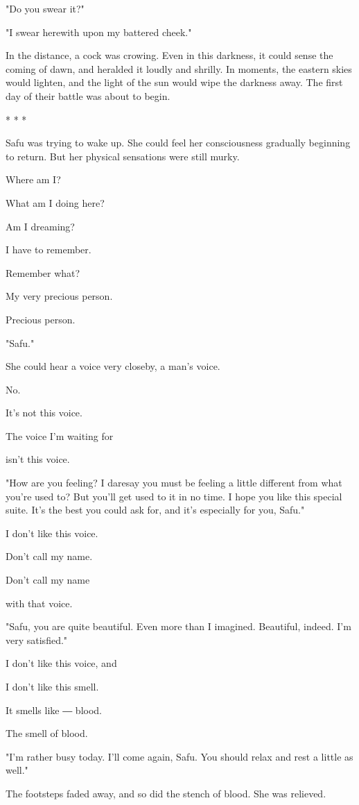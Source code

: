 "Do you swear it?"

"I swear herewith upon my battered cheek."

In the distance, a cock was crowing. Even in this darkness, it could
sense the coming of dawn, and heralded it loudly and shrilly. In
moments, the eastern skies would lighten, and the light of the sun would
wipe the darkness away. The first day of their battle was about to
begin.

* * *

Safu was trying to wake up. She could feel her consciousness gradually
beginning to return. But her physical sensations were still murky.

Where am I?

What am I doing here?

Am I dreaming?

I have to remember.

Remember what?

My very precious person.

Precious person.

"Safu."

She could hear a voice very closeby, a man's voice.

No.

It's not this voice.

The voice I'm waiting for

isn't this voice.

"How are you feeling? I daresay you must be feeling a little different
from what you're used to? But you'll get used to it in no time. I hope
you like this special suite. It's the best you could ask for, and it's
especially for you, Safu."

I don't like this voice.

Don't call my name.

Don't call my name

with that voice.

"Safu, you are quite beautiful. Even more than I imagined. Beautiful,
indeed. I'm very satisfied."

I don't like this voice, and

I don't like this smell.

It smells like ― blood.

The smell of blood.

"I'm rather busy today. I'll come again, Safu. You should relax and rest
a little as well."

The footsteps faded away, and so did the stench of blood. She was
relieved.

